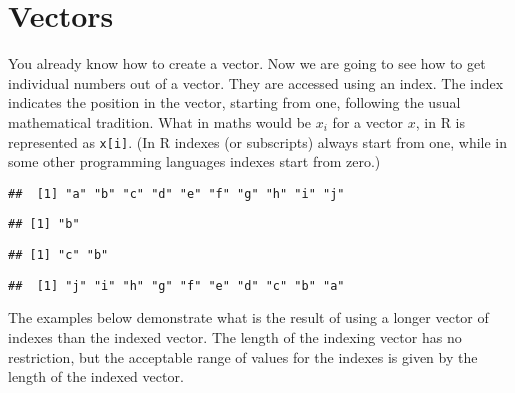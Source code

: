 \documentclass[paper=a4,10pt,div=17,headsepline,BCOR=12mm,twoside,open=right]{scrbook}\usepackage{knitr}
\begin{document}
\section{Vectors}

You already know how to create a vector. Now we are going to see how to get individual numbers out of a vector. They are accessed using an index. The index indicates the position in the vector, starting from one, following the usual mathematical tradition. What in maths would be $x_i$ for a vector $x$, in R is represented as \texttt{x[i]}. (In R indexes (or subscripts) always start from one, while in some other programming languages indexes start from zero.)

\begin{knitrout}\footnotesize
{}\color{fgcolor}\begin{kframe}
\begin{alltt}
 \hlkwb{<-} \hlstd{letters[}\hlopt{:}\hlstd{]}
\end{alltt}
\begin{verbatim}
##  [1] "a" "b" "c" "d" "e" "f" "g" "h" "i" "j"
\end{verbatim}
\begin{alltt}
\hlstd{a[}\hlstd{]}
\end{alltt}
\begin{verbatim}
## [1] "b"
\end{verbatim}
\begin{alltt}
\hlstd{a[}\hlstd{(}\hlstd{,}\hlstd{)]}
\end{alltt}
\begin{verbatim}
## [1] "c" "b"
\end{verbatim}
\begin{alltt}
\hlstd{a[}\hlopt{:}\hlstd{]}
\end{alltt}
\begin{verbatim}
##  [1] "j" "i" "h" "g" "f" "e" "d" "c" "b" "a"
\end{verbatim}
\end{kframe}
\end{knitrout}

The examples below demonstrate what is the result of using a longer vector of indexes than the indexed vector. The length of the indexing vector has no restriction, but the acceptable range of values for the indexes is given by the length of the indexed vector.
\end{document}
